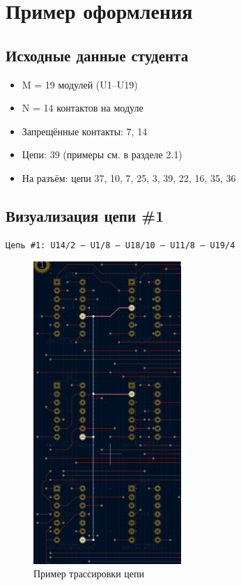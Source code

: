 \documentclass[a4paper, 12pt]{article}
\begin{document}
\section{Пример оформления}
\subsection{Исходные данные студента}
\begin{itemize}
	\item M = 19 модулей (U1–U19)
	\item N = 14 контактов на модуле
	\item Запрещённые контакты: 7, 14
	\item Цепи: 39 (примеры см. в разделе 2.1)
	\item На разъём: цепи 37, 10, 7, 25, 3, 39, 22, 16, 35, 36
\end{itemize}

\newpage
\subsection{Визуализация цепи \#1}
\begin{verbatim}
Цепь #1: U14/2 — U1/8 — U18/10 — U11/8 — U19/4
\end{verbatim}

\begin{figure}[h!]
	\centering
	\includegraphics[width=0.5\textwidth]{docs/net1.png}
	\caption{Пример трассировки цепи}
\end{figure}
\end{document}
